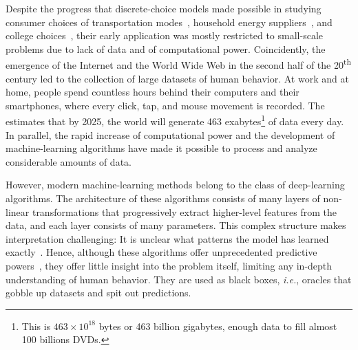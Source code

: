Despite the progress that discrete-choice models made possible in studying consumer choices of transportation modes~\citep{ben1973structure,mcfadden1974measurement}, household energy suppliers~\citep{goett2000customers}, and college choices~\citep{fuller1982new}, their early application was mostly restricted to small-scale problems due to lack of data and of computational power.
Coincidently, the emergence of the Internet and the World Wide Web in the second half of the 20\textsuperscript{th} century led to the collection of large datasets of human behavior.
At work and at home, people spend countless hours behind their computers and their smartphones, where every click, tap, and mouse movement is recorded.
The~\citet{wef2019data} estimates that by 2025, the world will generate 463 exabytes\footnote{This is $463 \times 10^{18}$ bytes or 463 billion gigabytes, enough data to fill almost 100 billions DVDs.} of data every day.
In parallel, the rapid increase of computational power and the development of machine-learning algorithms have made it possible to process and analyze considerable amounts of data.

However, modern machine-learning methods belong to the class of deep-learning algorithms.
The architecture of these algorithms consists of many layers of non-linear transformations that progressively extract higher-level features from the data, and each layer consists of many parameters.
This complex structure makes interpretation challenging:
It is unclear what patterns the model has learned exactly~\citep{fong2017interpretable,guidotti2018survey,olah2020zoom,hilton2020understanding}.
Hence, although these algorithms offer unprecedented predictive powers~\citep{lecun2015deep}, they offer little insight into the problem itself, limiting any in-depth understanding of human behavior.
They are used as black boxes, \textit{i.e.}, oracles that gobble up datasets and spit out predictions.

